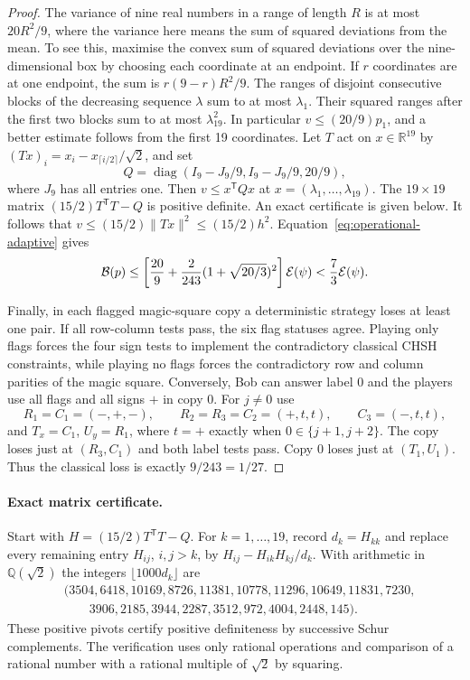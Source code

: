 \begin{proof}
The variance of nine real numbers in a range of length $R$ is at most $20R^2/9$, where the variance here means the sum of squared deviations from the mean. To see this, maximise the convex sum of squared deviations over the nine-dimensional box by choosing each coordinate at an endpoint. If $r$ coordinates are at one endpoint, the sum is $r(9-r)R^2/9$. The ranges of disjoint consecutive blocks of the decreasing sequence $\lambda$ sum to at most $\lambda_1$. Their squared ranges after the first two blocks sum to at most $\lambda_{19}^2$. In particular $v\le(20/9)p_1$, and a better estimate follows from the first 19 coordinates. Let $T$ act on $x\in\mathbb R^{19}$ by $(Tx)_i=x_i-x_{\lceil i/2\rceil}/\sqrt2$, and set
\[
 Q=\operatorname{diag}(I_9-J_9/9,I_9-J_9/9,20/9),
\]
where $J_9$ has all entries one. Then $v\le x^{\mathsf T}Qx$ at $x=(\lambda_1,\ldots,\lambda_{19})$. The $19\times19$ matrix $(15/2)T^{\mathsf T}T-Q$ is positive definite. An exact certificate is given below. It follows that $v\le(15/2)\|Tx\|^2\le(15/2)h^2$. Equation~\eqref{eq:operational-adaptive} gives
\[
 \mathcal B(p)\le\left[\frac{20}{9}+\frac2{243}(1+\sqrt{20/3})^2\right]\mathcal{E}(\psi)<\frac73\mathcal{E}(\psi).
\]

Finally, in each flagged magic-square copy a deterministic strategy loses at least one pair. If all row-column tests pass, the six flag statuses agree. Playing only flags forces the four sign tests to implement the contradictory classical CHSH constraints, while playing no flags forces the contradictory row and column parities of the magic square. Conversely, Bob can answer label $0$ and the players use all flags and all signs $+$ in copy $0$. For $j\ne0$ use
\[
 R_1=C_1=(-,+,-),\qquad R_2=R_3=C_2=(+,t,t),\qquad C_3=(-,t,t),
\]
and $T_x=C_1$, $U_y=R_1$, where $t=+$ exactly when $0\in\{j+1,j+2\}$. The copy loses just at $(R_3,C_1)$ and both label tests pass. Copy $0$ loses just at $(T_1,U_1)$. Thus the classical loss is exactly $9/243=1/27$.
\end{proof}

\paragraph{Exact matrix certificate.}
Start with $H=(15/2)T^{\mathsf T}T-Q$. For $k=1,\ldots,19$, record $d_k=H_{kk}$ and replace every remaining entry $H_{ij}$, $i,j>k$, by $H_{ij}-H_{ik}H_{kj}/d_k$. With arithmetic in $\mathbb Q(\sqrt2)$ the integers $\lfloor 1000d_k\rfloor$ are
\[
 \begin{split}
 &(3504,6418,10169,8726,11381,10778,11296,10649,11831,7230,\\
 &\qquad3906,2185,3944,2287,3512,972,4004,2448,145).
 \end{split}
\]
These positive pivots certify positive definiteness by successive Schur complements. The verification uses only rational operations and comparison of a rational number with a rational multiple of $\sqrt2$ by squaring.

